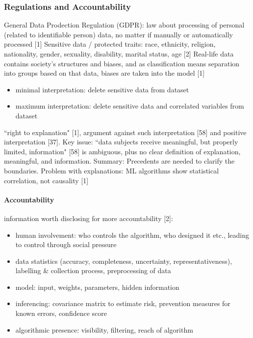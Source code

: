\subsubsection{Regulations and Accountability}
General Data Prodection Regulation (GDPR): law about processing of personal (related to identifiable person) data, no matter if manually or automatically processed [1] \newline
Sensitive data / protected traits: race, ethnicity, religion, nationality, gender, sexuality, disability, marital status, age [2] \newline
Real-life data contains society's structures and biases, and as classification means separation into groups based on that data, biases are taken into the model [1] \newline
\begin{itemize}
	\item minimal interpretation: delete sensitive data from dataset
	\item maximum interpretation: delete sensitive data and correlated variables from dataset
\end{itemize}
``right to explanation" [1], argument against such interpretation [58] and positive interpretation [37]. Key issue: ``data subjects receive meaningful, but properly limited, information" [58] is ambiguous, plus no clear definition of explanation, meaningful, and information. Summary: Precedents are needed to clarify the boundaries.\newline
Problem with explanations: ML algorithms show statistical correlation, not causality [1]\newline


\paragraph{Accountability}
information worth disclosing for more accountability [2]:
\begin{itemize}
	\item human involvement: who controls the algorithm, who designed it etc., leading to control through social pressure
	\item data statistics (accuracy, completeness, uncertainty, representativeness), labelling \& collection process, preprocessing of data
	\item model: input, weights, parameters, hidden information
	\item inferencing: covariance matrix to estimate risk, prevention measures for known errors, confidence score 
	\item algorithmic presence: visibility, filtering, reach of algorithm
\end{itemize}







